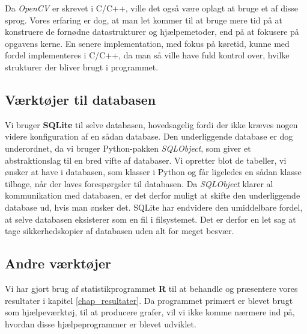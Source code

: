 {Da \emph{OpenCV} er skrevet i C/C++, ville det også være oplagt at bruge
et af disse sprog. Vores erfaring er dog, at man let kommer til at bruge
mere tid på at konstruere de fornødne datastrukturer og hjælpemetoder,
end på at fokusere på opgavens kerne. En senere implementation, med
fokus på køretid, kunne med fordel implementeres i C/C++, da man så
ville have fuld kontrol over, hvilke strukturer der bliver brugt i
programmet.

\subsection{Værktøjer til databasen}
Vi bruger \textbf{SQLite}\cite{Sqlite} til selve databasen, hovedsagelig
fordi der ikke kræves nogen videre konfiguration af en sådan database.
Den underliggende database er dog underordnet, da vi bruger
Python-pakken \emph{SQLObject}\cite{Sqlobject}, som giver et
abstraktionslag til en bred vifte af databaser. Vi opretter blot de
tabeller, vi ønsker at have i databasen, som klasser i Python og får
ligeledes en sådan klasse tilbage, når der laves forespørgsler til
databasen. Da \emph{SQLObject} klarer al kommunikation med databasen, er
det derfor muligt at skifte den underliggende database ud, hvis man
ønsker det. SQLite har endvidere den umiddelbare fordel, at selve
databasen eksisterer som en fil i filsystemet.  Det er derfor en let sag
at tage sikkerhedskopier af databasen uden alt for meget besvær.

\subsection{Andre værktøjer}
Vi har gjort brug af statistikprogrammet \textbf{R}\cite{Rlang} til at
behandle og præsentere vores resultater i kapitel \ref{chap_resultater}.
Da programmet primært er blevet brugt som hjælpeværktøj, til at
producere grafer, vil vi ikke komme nærmere ind på, hvordan disse
hjælpeprogrammer er blevet udviklet.

}

